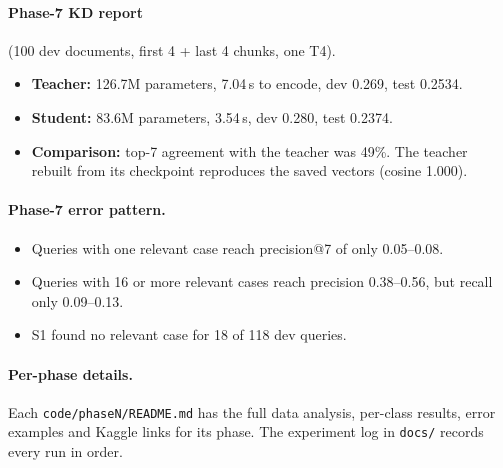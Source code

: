 \paragraph{Phase-7 KD report} (100 dev documents, first 4 + last 4 chunks, one T4).
\begin{itemize}
\item \textbf{Teacher:} 126.7M parameters, 7.04\,s to encode, dev 0.269, test 0.2534.
\item \textbf{Student:} 83.6M parameters, 3.54\,s, dev 0.280, test 0.2374.
\item \textbf{Comparison:} top-7 agreement with the teacher was 49\%. The teacher rebuilt from its checkpoint reproduces the saved vectors (cosine 1.000).
\end{itemize}

\paragraph{Phase-7 error pattern.}
\begin{itemize}
\item Queries with one relevant case reach precision@7 of only 0.05--0.08.
\item Queries with 16 or more relevant cases reach precision 0.38--0.56, but recall only 0.09--0.13.
\item S1 found no relevant case for 18 of 118 dev queries.
\end{itemize}

\paragraph{Per-phase details.} Each \texttt{code/phaseN/README.md} has the full data analysis, per-class results, error examples and Kaggle links for its phase. The experiment log in \texttt{docs/} records every run in order.


